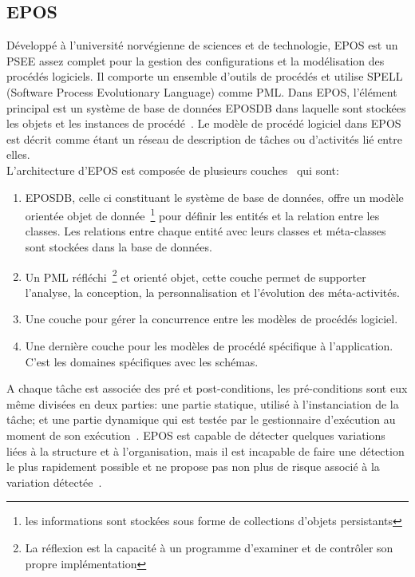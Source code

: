\subsection*{EPOS}
Développé à l'université norvégienne de sciences et de technologie, EPOS est un PSEE assez complet pour la gestion des configurations et la modélisation des procédés logiciels.
Il comporte un ensemble d'outils de procédés et utilise SPELL (Software Process Evolutionary Language) comme PML.
Dans EPOS, l'élément principal est un système de base de données \og EPOSDB \fg{} dans laquelle sont stockées les objets et les instances de procédé~\cite{capri}. 
Le modèle de procédé logiciel dans EPOS est décrit comme étant un réseau de description de tâches ou d'activités lié entre elles.\\
L'architecture d'EPOS est composée de plusieurs couches~\cite{tpme} qui sont:
\begin{enumerate}
\item EPOSDB, celle ci constituant le système de base de données, offre un modèle orientée objet de donnée~\footnote{les informations sont stockées sous forme de collections d'objets persistants} pour définir les entités et la relation entre les classes. Les relations entre chaque entité avec leurs classes et méta-classes sont stockées dans la base de données.
\item Un PML réfléchi~\footnote{La réflexion est la capacité à un programme d'examiner et de contrôler son propre implémentation} et orienté objet, cette couche permet de supporter l'analyse, la conception, la personnalisation et l'évolution des méta-activités.
\item Une couche pour gérer la concurrence entre les modèles de procédés logiciel.
\item Une dernière couche pour les modèles de procédé spécifique à l'application. C'est les domaines spécifiques avec les schémas.
\end{enumerate}
A chaque tâche est associée des pré et post-conditions, les pré-conditions sont eux même divisées en deux parties: une partie statique, utilisé à l'instanciation de la tâche; et une partie dynamique qui est testée par le gestionnaire d'exécution au moment de son exécution~\cite{capri}.
EPOS est capable de détecter quelques variations liées à la structure et à l'organisation, mais il est incapable de faire une détection le plus rapidement possible et ne propose pas non plus de risque associé à la variation détectée~\cite{alm2224}.


